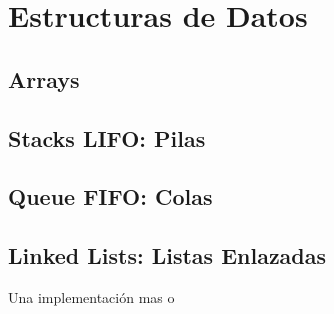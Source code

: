\documentclass[12pt, fleqn]{report}                             %
\theoremstyle{break}                                            %
\begin{document}
\part{Estructuras de Datos}

    \clearpage
    \chapter{Arrays}

    \clearpage
    \chapter{Stacks LIFO: Pilas}

    \clearpage
    \chapter{Queue FIFO: Colas}

    \clearpage
    \chapter{Linked Lists: Listas Enlazadas}

        Una implementación mas o 


    \clearpage
\end{document}
